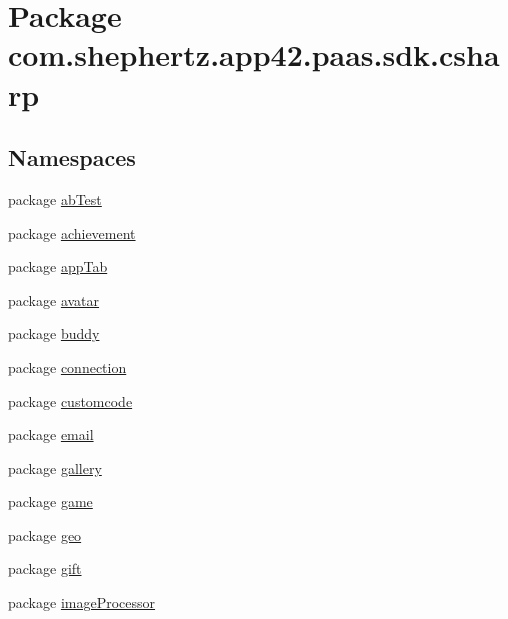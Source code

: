 \hypertarget{namespacecom_1_1shephertz_1_1app42_1_1paas_1_1sdk_1_1csharp}{\section{Package com.\+shephertz.\+app42.\+paas.\+sdk.\+csharp}
\label{namespacecom_1_1shephertz_1_1app42_1_1paas_1_1sdk_1_1csharp}
}
\subsection*{Namespaces}
\begin{DoxyCompactItemize}
\item 
package \hyperlink{namespacecom_1_1shephertz_1_1app42_1_1paas_1_1sdk_1_1csharp_1_1ab_test}{ab\+Test}
\item 
package \hyperlink{namespacecom_1_1shephertz_1_1app42_1_1paas_1_1sdk_1_1csharp_1_1achievement}{achievement}
\item 
package \hyperlink{namespacecom_1_1shephertz_1_1app42_1_1paas_1_1sdk_1_1csharp_1_1app_tab}{app\+Tab}
\item 
package \hyperlink{namespacecom_1_1shephertz_1_1app42_1_1paas_1_1sdk_1_1csharp_1_1avatar}{avatar}
\item 
package \hyperlink{namespacecom_1_1shephertz_1_1app42_1_1paas_1_1sdk_1_1csharp_1_1buddy}{buddy}
\item 
package \hyperlink{namespacecom_1_1shephertz_1_1app42_1_1paas_1_1sdk_1_1csharp_1_1connection}{connection}
\item 
package \hyperlink{namespacecom_1_1shephertz_1_1app42_1_1paas_1_1sdk_1_1csharp_1_1customcode}{customcode}
\item 
package \hyperlink{namespacecom_1_1shephertz_1_1app42_1_1paas_1_1sdk_1_1csharp_1_1email}{email}
\item 
package \hyperlink{namespacecom_1_1shephertz_1_1app42_1_1paas_1_1sdk_1_1csharp_1_1gallery}{gallery}
\item 
package \hyperlink{namespacecom_1_1shephertz_1_1app42_1_1paas_1_1sdk_1_1csharp_1_1game}{game}
\item 
package \hyperlink{namespacecom_1_1shephertz_1_1app42_1_1paas_1_1sdk_1_1csharp_1_1geo}{geo}
\item 
package \hyperlink{namespacecom_1_1shephertz_1_1app42_1_1paas_1_1sdk_1_1csharp_1_1gift}{gift}
\item 
package \hyperlink{namespacecom_1_1shephertz_1_1app42_1_1paas_1_1sdk_1_1csharp_1_1image_processor}{image\+Processor}

\end{DoxyCompactItemize}
